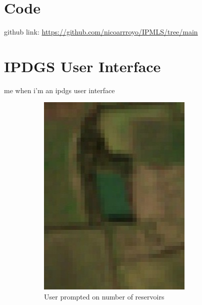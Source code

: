 \section{Code}
github link: \url{https://github.com/nicoarrroyo/IPMLS/tree/main}

\section{IPDGS User Interface}
me when i'm an ipdgs user interface

\begin{figure}
     \centering
     \begin{subfigure}[b]{0.3\textwidth}
         \centering
         \includegraphics[width=\linewidth]{contents/figures/LR 10m res.jpg}
         \caption{User prompted on number of reservoirs}
         \label{fig:ipdgs ui first prompt}
     \end{subfigure}
     \hfill
     \begin{subfigure}[b]{0.3\textwidth}

\end{subfigure}
\end{figure}

